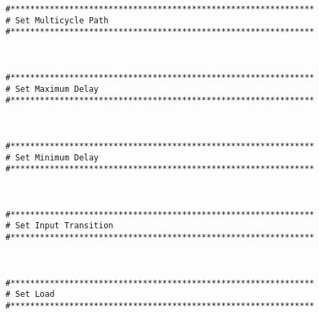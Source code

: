 \begin{verbatim}
#**************************************************************
# Set Multicycle Path
#**************************************************************



#**************************************************************
# Set Maximum Delay
#**************************************************************



#**************************************************************
# Set Minimum Delay
#**************************************************************



#**************************************************************
# Set Input Transition
#**************************************************************



#**************************************************************
# Set Load
#**************************************************************




\end{verbatim}
